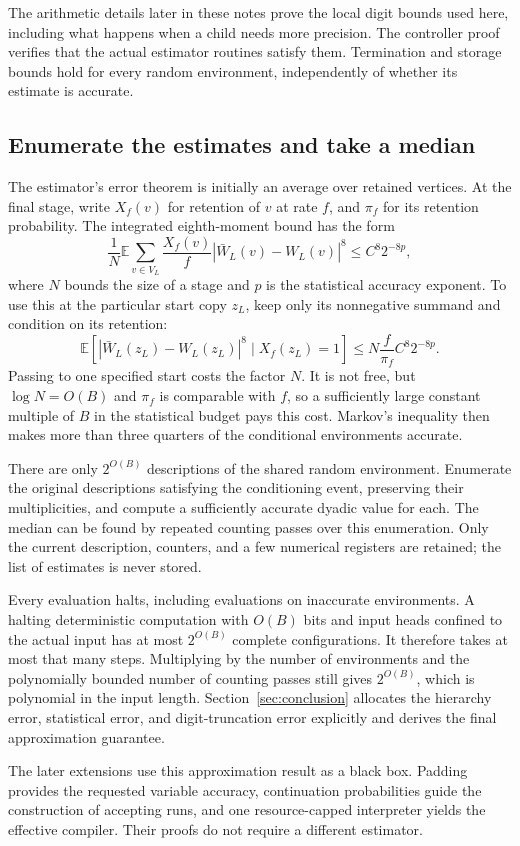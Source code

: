 The arithmetic details later in these notes prove the local digit bounds used here, including what happens when a child needs more precision. The controller proof verifies that the actual estimator routines satisfy them. Termination and storage bounds hold for every random environment, independently of whether its estimate is accurate.

\subsection{Enumerate the estimates and take a median}

The estimator's error theorem is initially an average over retained vertices. At the final stage, write $X_f(v)$ for retention of $v$ at rate $f$, and $\pi_f$ for its retention probability. The integrated eighth-moment bound has the form
\[
 \frac1N\mathbb E\sum_{v\in V_L}\frac{X_f(v)}f
 |\bar W_L(v)-W_L(v)|^8\le C^8 2^{-8p},
\]
where $N$ bounds the size of a stage and $p$ is the statistical accuracy exponent. To use this at the particular start copy $z_L$, keep only its nonnegative summand and condition on its retention:
\[
 \mathbb E\!\left[|\bar W_L(z_L)-W_L(z_L)|^8\mid X_f(z_L)=1\right]
 \le N\frac f{\pi_f}C^8 2^{-8p}.
\]
Passing to one specified start costs the factor $N$. It is not free, but $\log N=O(B)$ and $\pi_f$ is comparable with $f$, so a sufficiently large constant multiple of $B$ in the statistical budget pays this cost. Markov's inequality then makes more than three quarters of the conditional environments accurate.

There are only $2^{O(B)}$ descriptions of the shared random environment. Enumerate the original descriptions satisfying the conditioning event, preserving their multiplicities, and compute a sufficiently accurate dyadic value for each. The median can be found by repeated counting passes over this enumeration. Only the current description, counters, and a few numerical registers are retained; the list of estimates is never stored.

Every evaluation halts, including evaluations on inaccurate environments. A halting deterministic computation with $O(B)$ bits and input heads confined to the actual input has at most $2^{O(B)}$ complete configurations. It therefore takes at most that many steps. Multiplying by the number of environments and the polynomially bounded number of counting passes still gives $2^{O(B)}$, which is polynomial in the input length. Section~\ref{sec:conclusion} allocates the hierarchy error, statistical error, and digit-truncation error explicitly and derives the final approximation guarantee.

The later extensions use this approximation result as a black box. Padding provides the requested variable accuracy, continuation probabilities guide the construction of accepting runs, and one resource-capped interpreter yields the effective compiler. Their proofs do not require a different estimator.
